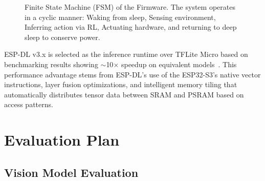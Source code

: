 \documentclass[conference]{IEEEtran}
\begin{document}
    \begin{figure}[!t]
    \centering
    \caption{Finite State Machine (FSM) of the Firmware. The system operates in a cyclic manner: Waking from sleep, Sensing environment, Inferring action via RL, Actuating hardware, and returning to deep sleep to conserve power.}
    \label{fig:fsm}
    \end{figure}

    ESP-DL v3.x is selected as the inference runtime over TFLite Micro based on benchmarking results showing $\sim$10$\times$ speedup on equivalent models~\cite{espdl2024}. This performance advantage stems from ESP-DL's use of the ESP32-S3's native vector instructions, layer fusion optimizations, and intelligent memory tiling that automatically distributes tensor data between SRAM and PSRAM based on access patterns.

    \FloatBarrier
    \section{Evaluation Plan}
    \label{sec:evaluation}

    \subsection{Vision Model Evaluation}
\end{document}
